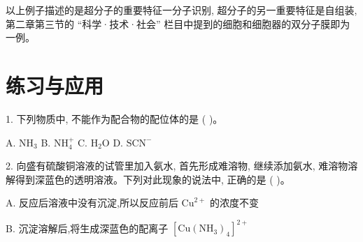 \documentclass[10pt]{article}
\begin{document}
\begin{center}
\end{center}

以上例子描述的是超分子的重要特征一分子识别, 超分子的另一重要特征是自组装, 第二章第三节的 “科学·技术·社会” 栏目中提到的细胞和细胞器的双分子膜即为一例。

\section*{练习与应用}

1. 下列物质中, 不能作为配合物的配位体的是 ( )。

A. \({\mathrm{{NH}}}_{3}\) B. \({\mathrm{{NH}}}_{4}^{ + }\) C. \({\mathrm{H}}_{2}\mathrm{O}\) D. \({\mathrm{{SCN}}}^{ - }\)

2. 向盛有硫酸铜溶液的试管里加入氨水, 首先形成难溶物, 继续添加氨水, 难溶物溶解得到深蓝色的透明溶液。下列对此现象的说法中, 正确的是 ( )。

A. 反应后溶液中没有沉淀,所以反应前后 \({\mathrm{{Cu}}}^{2 + }\) 的浓度不变

B. 沉淀溶解后,将生成深蓝色的配离子 \({\left\lbrack \mathrm{{Cu}}{\left( {\mathrm{{NH}}}_{3}\right) }_{4}\right\rbrack }^{2 + }\)
\end{document}
